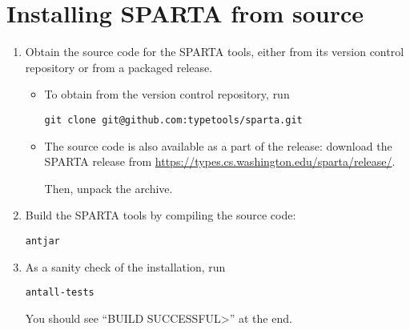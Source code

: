 \section{Installing SPARTA from source\label{install-source}}

\begin{enumerate}

\item
  Obtain the source code for the SPARTA tools, either from its version
  control repository or from a packaged release.

\begin{itemize}
\item
  To obtain from the version control repository, run
\begin{Verbatim}
git clone git@github.com:typetools/sparta.git
\end{Verbatim}
\item

The source code is also available as a part of the release:
  download the SPARTA release from
  \url{https://types.cs.washington.edu/sparta/release/}.

  Then, unpack the archive.
\end{itemize}

%


\item Build the SPARTA tools by compiling the source code:
\begin{alltt}
ant jar
\end{alltt}

\item
As a sanity check of the installation, run

\begin{alltt}
ant all-tests
\end{alltt}

You should see ``\<BUILD SUCCESSFUL>'' at the end.


\end{enumerate}

